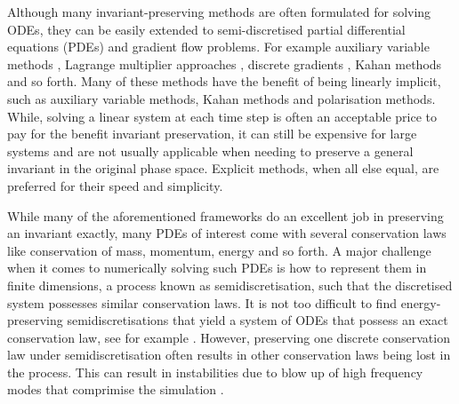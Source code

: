 \documentclass[final,3p,times]{elsarticle}
\begin{document}
Although many invariant-preserving methods are often formulated for solving ODEs, they can be easily extended to semi-discretised partial differential equations (PDEs) and gradient flow problems. For example auxiliary variable methods \cite{shen2018scalar,cai2025explicit, zhang2020novel, jiang2022improving, obbadi2025stable, hong2025auxiliary}, Lagrange multiplier approaches \cite{cheng2025unique}, discrete gradients \cite{dahlby2011general}, Kahan methods \cite{eidnes2021linearly, uzunca2023linearly} and so forth. Many of these methods have the benefit of being linearly implicit, such as auxiliary variable methods, Kahan methods and polarisation methods. While, solving a linear system at each time step is often an acceptable price to pay for the benefit invariant preservation, it can still be expensive for large systems and are not usually applicable when needing to preserve a general invariant in the original phase space. Explicit methods, when all else equal, are preferred for their speed and simplicity.

While many of the aforementioned frameworks do an excellent job in preserving an invariant exactly, many PDEs of interest come with several conservation laws like conservation of mass, momentum, energy and so forth. A major challenge when it comes to numerically solving such PDEs is how to represent them in finite dimensions, a process known as semidiscretisation, such that the discretised system possesses similar conservation laws. It is not too difficult to find energy-preserving semidiscretisations that yield a system of ODEs that possess an exact conservation law, see for example \cite{celledoni2012preserving}. However, preserving one discrete conservation law under semidiscretisation often results in other conservation laws being lost in the process. This can result in instabilities due to blow up of high frequency modes that comprimise the simulation \cite{offen2019symplectic_clebsch, coppola2019discrete}. 
\end{document}
